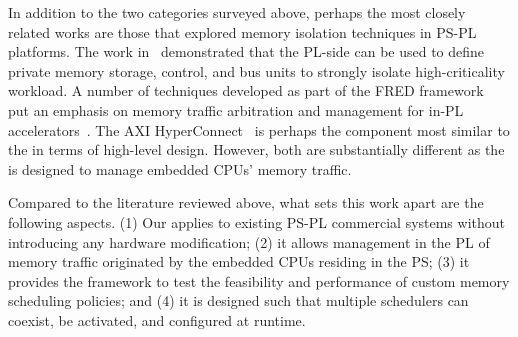 In addition to the two categories surveyed above, perhaps the most
closely related works are those that explored memory isolation
techniques in PS-PL platforms. The work
in~\cite{gracioli2019designing} demonstrated that the PL-side can be
used to define private memory storage, control, and bus units to strongly isolate high-criticality workload. A number of techniques
developed as part of the FRED framework~\cite{fred_ssup} put an
emphasis on memory traffic arbitration and management for in-PL
accelerators~\cite{fred_hyperconnect, fred_abe}. The AXI
HyperConnect~\cite{fred_hyperconnect} is perhaps the component most
similar to the \schim in terms of high-level design. However, both are
substantially different as the \schim is designed to manage
embedded CPUs' memory traffic.

Compared to the literature reviewed above, what sets this work apart
are the following aspects. (1) Our \schim applies to existing PS-PL
commercial systems without introducing any hardware modification; (2)
it allows management in the PL of memory traffic originated by the
embedded CPUs residing in the PS; (3) it provides the framework to
test the feasibility and performance of custom memory scheduling
policies; and (4) it is designed such that multiple schedulers can
coexist, be activated, and configured at runtime.



